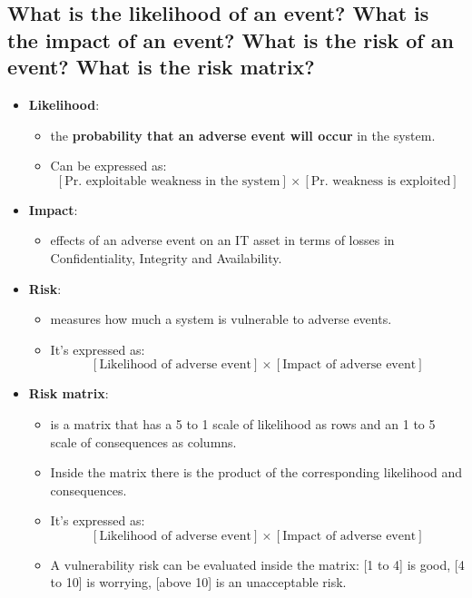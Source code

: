\documentclass[9pt, letterpaper]{article}
\begin{document}
\subsection{What is the likelihood of an event? What is the impact of an event? What is the risk of an event? What is the risk matrix?}
\begin{itemize}
	\item \textbf{Likelihood}: 
	\begin{itemize}
		\item the \textbf{probability that an adverse event will occur} in the system.
		\item  Can be expressed as: $$[\text{Pr. exploitable weakness in the system}] \times [\text{Pr. weakness is exploited}]$$
	\end{itemize}	
	\item \textbf{Impact}:
	\begin{itemize}
		\item effects of an adverse event on an IT asset in terms of losses in Confidentiality, Integrity and Availability.
	\end{itemize}
	\item \textbf{Risk}: 
	\begin{itemize}
		\item measures how much a system is vulnerable to adverse events.
		\item It's expressed as: $$[\text{Likelihood of adverse event}] \times [\text{Impact of adverse event}]$$
	\end{itemize}
	\item \textbf{Risk matrix}:
	\begin{itemize}
		\item is a matrix that has a 5 to 1 scale of likelihood as rows and an 1 to 5 scale of consequences as columns. 
		\item Inside the matrix there is the product of the corresponding likelihood and consequences.
		\item It's expressed as: $$[\text{Likelihood of adverse event}] \times [\text{Impact of adverse event}]$$
		\item A vulnerability risk can be evaluated inside the matrix: [1 to 4] is good, [4 to 10] is worrying, [above 10] is an unacceptable risk.
	\end{itemize}
\end{itemize}

\newpage
\end{document}
